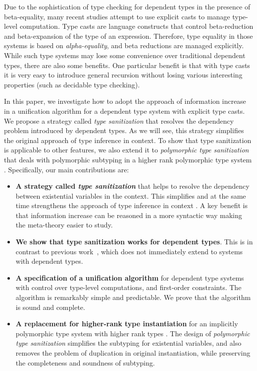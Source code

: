 Due to the sophistication of type checking for dependent types in the
presence of beta-equality, many recent
studies \citep{van2013explicit, kimmell2012equational, sjoberg2012irrelevance,
  sjoberg2015programming, stump2009verified, sulzmann2007system,
  yang2016unified} attempt to use explicit casts to manage type-level
computation. Type casts are language constructs that control beta-reduction and
beta-expansion of the type of an expression. Therefore, type equality
in those systems is based
on \emph{alpha-equality}, and beta reductions are managed
explicitly. While such type systems may lose some convenience over 
traditional dependent types, there are also some benefits. 
One particular benefit is that with type casts 
it is very easy to introduce general recursion without losing 
various interesting properties (such as decidable type checking).

In this paper, we investigate how to adopt the approach of information increase
in a unification algorithm for a dependent type system with
explicit type casts. We propose a strategy called \textit{type sanitization} that
resolves the dependency problem introduced by dependent types. As we will see,
this strategy simplifies the original approach of type inference in context.
To show that type sanitization is applicable to other features, we also
extend it to \textit{polymorphic type sanitization} that deals with polymorphic
subtyping in a higher rank polymorphic type system \citep{dunfield2013complete}.
Specifically, our main contributions are:

\begin{itemize}
\item \textbf{A strategy called \textit{type sanitization}} that helps
  to resolve
  the dependency between existential variables in the context. This simplifies
  and at the same time strengthens the approach of type inference in context
  \citep{gundry2010type}. A key benefit is that information increase can be reasoned in a more
  syntactic way making the meta-theory easier to study. 
\item \textbf{We show that type sanitization works for dependent types}. This is
  in contrast to previous work~\citep{gundry2010type, dunfield2013complete, dunfield16gadts}, which does not immediately extend to systems with
  dependent types.
\item \textbf{A specification of a unification algorithm} for dependent type
  systems with control over type-level computations, and first-order
  constraints. The algorithm is remarkably simple and predictable. We prove that
  the algorithm is sound and complete.
\item \textbf{A replacement for higher-rank type instantiation} for an
  implicitly polymorphic type system with higher rank types
  \citep{dunfield2013complete}. The design of \textit{polymorphic type
    sanitization} simplifies the subtyping for existential variables, and also
  removes the problem of duplication in original instantiation, while preserving
  the completeness and soundness of subtyping.
\end{itemize}

